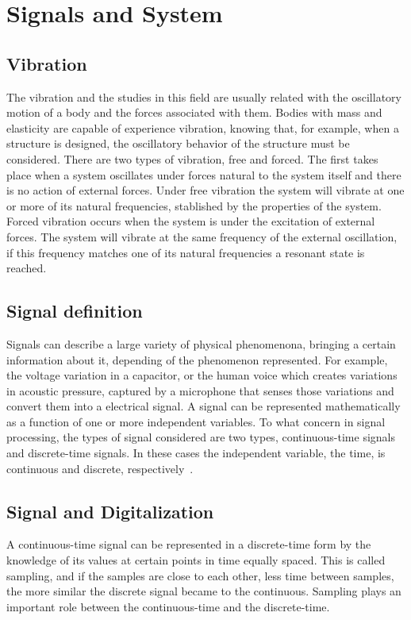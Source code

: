 
\section{Signals and System}\label{sec:sigNsys}
\subsection{Vibration}
The vibration and the studies in this field are usually related with the oscillatory motion of a body and the forces associated with them. Bodies with mass and elasticity are capable of experience vibration, knowing that, for example, when a structure is designed, the oscillatory behavior of the structure must be considered. There are two types of vibration, free and forced. The first takes place when a system oscillates under forces natural to the system itself and there is no action of external forces. Under free vibration the system will vibrate at one or more of its natural frequencies, stablished by the properties of the system. Forced vibration occurs when the system is under the excitation of external forces. The system will vibrate at the same frequency of the external oscillation, if this frequency matches one of its natural frequencies a resonant state is reached.   

\subsection{Signal definition}
Signals can describe a large variety of physical phenomenona, bringing a certain information about it, depending of the phenomenon represented. For example, the voltage variation in a capacitor, or the human voice which creates variations in acoustic pressure, captured by a microphone that senses those variations and convert them into a electrical signal. A signal can be represented mathematically as a function of one or more independent variables. 
To what concern in signal processing, the types of signal considered are two types, continuous-time signals and discrete-time signals. In these cases the independent variable, the time, is continuous and discrete, respectively~\cite{oppenheimSignalsSystems1997}.

\subsection{Signal and Digitalization}
A continuous-time signal can be represented in a discrete-time form by the knowledge of its values at certain points in time equally spaced. This is called sampling, and if the samples are close to each other, less time between samples, the more similar the discrete signal became to the continuous. Sampling plays an important role between the continuous-time and the discrete-time.

